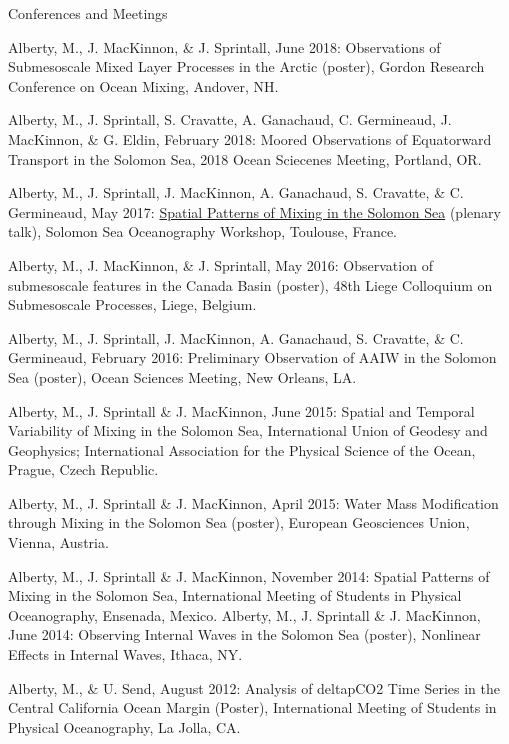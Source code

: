 \documentclass{resume} %
\begin{document}
\begin{rSection}{Conferences and Meetings} 
\item Alberty, M., J. MacKinnon, \& J. Sprintall, June 2018: Observations of Submesoscale Mixed Layer Processes in the Arctic (poster), Gordon Research Conference on Ocean Mixing, Andover, NH.
\item Alberty, M., J. Sprintall, S. Cravatte, A. Ganachaud, C. Germineaud, J. MacKinnon, \& G. Eldin, February 2018: Moored Observations of Equatorward Transport in the Solomon Sea, 2018 Ocean Sciecenes Meeting, Portland, OR.
\item Alberty, M., J. Sprintall, J. MacKinnon, A. Ganachaud, S. Cravatte, \& C. Germineaud, May 2017: \href{http://www.legos.obs-mip.fr/members/cravatte/alberty-talk}{Spatial Patterns of Mixing in the Solomon Sea} (plenary talk), Solomon Sea Oceanography Workshop, Toulouse, France. 
\item Alberty, M., J. MacKinnon, \& J. Sprintall, May 2016: Observation of submesoscale features in the Canada Basin (poster), 48th Liege Colloquium on Submesoscale Processes, Liege, Belgium.
\item Alberty, M., J. Sprintall, J. MacKinnon, A. Ganachaud, S. Cravatte, \& C. Germineaud, February 2016: Preliminary Observation of AAIW in the Solomon Sea (poster), Ocean Sciences Meeting, New Orleans, LA. 
\item Alberty, M., J. Sprintall \& J. MacKinnon, June 2015: Spatial and Temporal Variability of Mixing in the Solomon Sea, International Union of Geodesy and Geophysics; International Association for the Physical Science of the Ocean, Prague, Czech Republic.
\item Alberty, M., J. Sprintall \& J. MacKinnon, April 2015: Water Mass Modification through Mixing in the Solomon Sea (poster), European Geosciences Union, Vienna, Austria.
\item Alberty, M., J. Sprintall \& J. MacKinnon, November 2014: Spatial Patterns of Mixing in the Solomon Sea, International Meeting of Students in Physical Oceanography, Ensenada, Mexico.
\itme Alberty, M., J. Sprintall \& J. MacKinnon, June 2014: Observing Internal Waves in the Solomon Sea (poster), Nonlinear Effects in Internal Waves, Ithaca, NY.
\item Alberty, M., \& U. Send, August 2012: Analysis of deltapCO2 Time Series in the Central California Ocean Margin (Poster), International Meeting of Students in Physical Oceanography, La Jolla, CA. 
\end{rSection}
\end{document}
